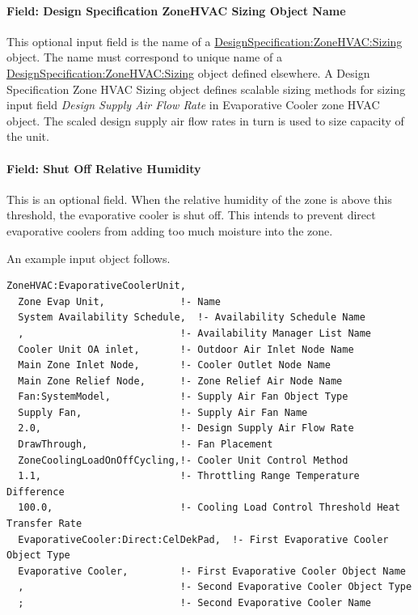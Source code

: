 \paragraph{Field: Design Specification ZoneHVAC Sizing Object Name}\label{field-design-specification-zonehvac-sizing-object-name-4}

This optional input field is the name of a \hyperref[designspecificationzonehvacsizing]{DesignSpecification:ZoneHVAC:Sizing} object. The name must correspond to unique name of a \hyperref[designspecificationzonehvacsizing]{DesignSpecification:ZoneHVAC:Sizing} object defined elsewhere. A Design Specification Zone HVAC Sizing object defines scalable sizing methods for sizing input field \emph{Design Supply Air Flow Rate} in Evaporative Cooler zone HVAC object. The scaled design supply air flow rates in turn is used to size capacity of the unit.

\paragraph{Field: Shut Off Relative Humidity}\label{shut-off-relative-humidity}

This is an optional field. When the relative humidity of the zone is above this
threshold, the evaporative cooler is shut off. This intends to prevent direct
evaporative coolers from adding too much moisture into the zone.

An example input object follows.

\begin{lstlisting}
ZoneHVAC:EvaporativeCoolerUnit,
  Zone Evap Unit,             !- Name
  System Availability Schedule,  !- Availability Schedule Name
  ,                           !- Availability Manager List Name
  Cooler Unit OA inlet,       !- Outdoor Air Inlet Node Name
  Main Zone Inlet Node,       !- Cooler Outlet Node Name
  Main Zone Relief Node,      !- Zone Relief Air Node Name
  Fan:SystemModel,            !- Supply Air Fan Object Type
  Supply Fan,                 !- Supply Air Fan Name
  2.0,                        !- Design Supply Air Flow Rate
  DrawThrough,                !- Fan Placement
  ZoneCoolingLoadOnOffCycling,!- Cooler Unit Control Method
  1.1,                        !- Throttling Range Temperature Difference
  100.0,                      !- Cooling Load Control Threshold Heat Transfer Rate
  EvaporativeCooler:Direct:CelDekPad,  !- First Evaporative Cooler Object Type
  Evaporative Cooler,         !- First Evaporative Cooler Object Name
  ,                           !- Second Evaporative Cooler Object Type
  ;                           !- Second Evaporative Cooler Name
\end{lstlisting}

